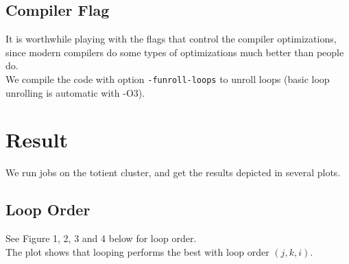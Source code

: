 \documentclass[12pt]{article}
\numberwithin{equation}{section}
\begin{document}
\subsection{Compiler Flag}

It is worthwhile playing with the flags that control the compiler optimizations, since modern compilers do some types of optimizations much better than people do.
\\
We compile the code with option \texttt{-funroll-loops} to unroll loops (basic loop unrolling is automatic with -O3).

\section{Result}

We run jobs on the totient cluster, and get the results depicted in several plots.

\subsection{Loop Order}

See Figure 1, 2, 3 and 4 below for loop order.
\\
The plot shows that looping performs the best with loop order $(j, k, i)$.
\end{document}
